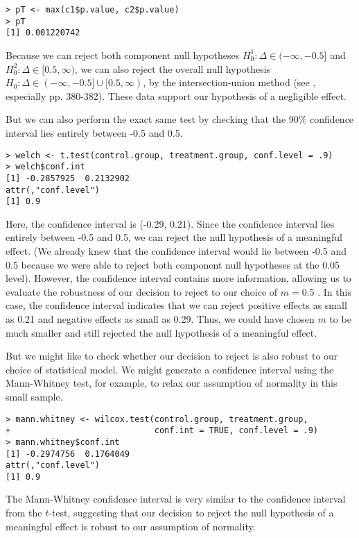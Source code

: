 \documentclass[12pt]{article}
\begin{document}
\begin{verbatim}
> pT <- max(c1$p.value, c2$p.value)
> pT
[1] 0.001220742
\end{verbatim}

\noindent Because we can reject both component null hypotheses $H^1_0 : \Delta \in (-\infty, -0.5]$ and $H^2_0 : \Delta \in [0.5, \infty)$, we can also reject the overall null hypothesis $H_0 : \Delta \in (-\infty, -0.5]\cup[0.5, \infty)$, by the intersection-union method (see \citealt{CasellaBerger2002}, especially pp. 380-382). These data support our hypothesis of a negligible effect.

But we can also perform the exact same test by checking that the 90\% confidence interval lies entirely between -0.5 and 0.5.

\begin{verbatim}
> welch <- t.test(control.group, treatment.group, conf.level = .9)
> welch$conf.int
[1] -0.2857925  0.2132902
attr(,"conf.level")
[1] 0.9
\end{verbatim}

Here, the confidence interval is (-0.29, 0.21). Since the confidence interval lies entirely between -0.5 and 0.5, we can reject the null hypothesis of a meaningful effect. (We already knew that the confidence interval would lie between -0.5 and 0.5 because we were able to reject both component null hypotheses at the 0.05 level). However, the confidence interval contains more information, allowing us to evaluate the robustness of our decision to reject to our choice of $m = 0.5$ . In this case, the confidence interval indicates that we can reject positive effects as small as 0.21 and negative effects as small as 0.29. Thus, we could have chosen $m$ to be much smaller and still rejected the null hypothesis of a meaningful effect.

But we might like to check whether our decision to reject is also robust to our choice of statistical model. We might generate a confidence interval using the Mann-Whitney test, for example, to relax our assumption of normality in this small sample.
\begin{verbatim}
> mann.whitney <- wilcox.test(control.group, treatment.group, 
+                             conf.int = TRUE, conf.level = .9)
> mann.whitney$conf.int
[1] -0.2974756  0.1764049
attr(,"conf.level")
[1] 0.9
\end{verbatim}

The Mann-Whitney confidence interval is very similar to the confidence interval from the $t$-test, suggesting that our decision to reject the null hypothesis of a meaningful effect is robust to our assumption of normality.
\end{document}

